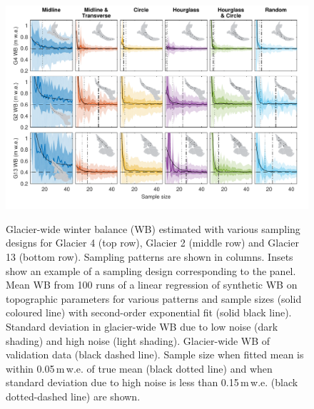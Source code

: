 \documentclass[twocolumn,letterpaper]{igs}
\begin{document}
\begin{figure}
	\centering
	\includegraphics[width =\textwidth]{SyntheticObsWB.pdf}\\
	\caption{Glacier-wide winter balance (WB) estimated with various sampling designs for Glacier 4 (top row), Glacier 2 (middle row) and Glacier 13 (bottom row). Sampling patterns are shown in columns. Insets show an example of a sampling design corresponding to the panel. Mean WB from 100 runs of a linear regression of synthetic WB on topographic parameters for various patterns and sample sizes (solid coloured line) with second-order exponential fit (solid black line). Standard deviation in glacier-wide WB due to low noise (dark shading) and high noise (light shading). Glacier-wide WB of validation data (black dashed line). Sample size when fitted mean is within 0.05\,m\,w.e. of true mean (black dotted line) and when standard deviation due to high noise is less than 0.15\,m\,w.e. (black dotted-dashed line) are shown.}
	\label{fig:SyntheticObsWB}
\end{figure}

\end{document}
